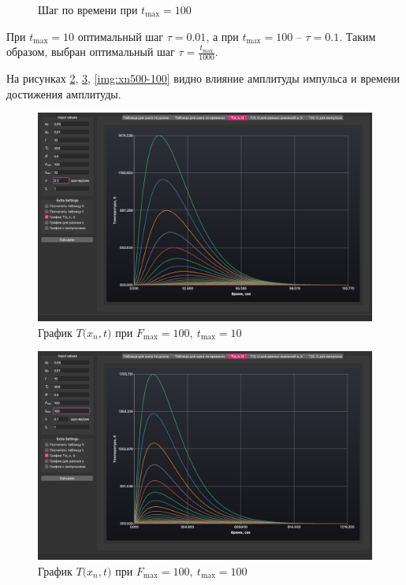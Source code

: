 \begin{enumerate}
\begin{minipage}{0.5\textwidth}
\begin{flushright}
\begin{figure}[H]
                    \caption{Шаг по времени при $t_\text{max} = 100$}
                    \label{img:steptau100}
                \end{figure}
            \end{flushright}
        \end{minipage}

        При $t_\text{max} = 10$ оптимальный шаг $\tau = 0.01$, а при $t_\text{max} = 100$ -- $\tau = 0.1$. Таким образом, выбран оптимальный шаг $\tau = \frac{t_\text{max}}{1000}$.

        На рисунках \ref{img:xn100-10}, \ref{img:xn100-100}, \ref{img:xn500-100} видно влияние амплитуды импульса и времени достижения амплитуды.

        \begin{figure}[H]
            \centering
            \includegraphics[scale=0.35]{img/xn100-10.png}
            \caption{График $T\big(x_n, t\big)$ при $F_\text{max} = 100,\ t_\text{max} = 10$}
            \label{img:xn100-10}
        \end{figure}

        \begin{figure}[H]
            \centering
            \includegraphics[scale=0.35]{img/xn100-100.png}
            \caption{График $T\big(x_n, t\big)$ при $F_\text{max} = 100,\ t_\text{max} = 100$}
            \label{img:xn100-100}
        \end{figure}


\end{enumerate}
